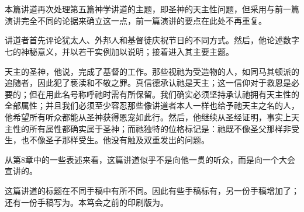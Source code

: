 

\section{}

\par

\par

本篇讲道再次处理第五篇神学讲道的主题，即圣神的天主性问题，但采用与前一篇演讲完全不同的论据来确立这一点，前一篇演讲的要点在此处不再重复。\par

讲道者首先评论犹太人、外邦人和基督徒庆祝节日的不同方式。然后，他论述数字七的神秘意义，并以若干实例加以说明；接着进入其主要主题。\par

天主的圣神，他说，完成了基督的工作。那些视祂为受造物的人，如同马其顿派的追随者，因此犯了亵渎和不敬之罪。真信德承认祂是天主；这一信仰对于救恩是必要的；但在用此名号称呼祂时需有所保留。我们确实必须坚持承认祂拥有天主性的全部属性；并且我们必须至少容忍那些像讲道者本人一样也给予祂天主之名的人，他希望所有听众都能从圣神获得恩宠如此行。然后，他继续从圣经证明，事实上天主性的所有属性都确实属于圣神；而祂独特的位格标记是：祂既不像圣父那样非受生，也不像圣子那样受生。他没有触及双重发出的问题。\par

从第8章中的一些表述来看，这篇讲道似乎不是向他一贯的听众，而是向一个大会宣讲的。\par

这篇讲道的标题在不同手稿中有所不同。因此有些手稿标有，另一份手稿增加了；还有一份手稿写为。本笃会之前的印刷版为。\par

